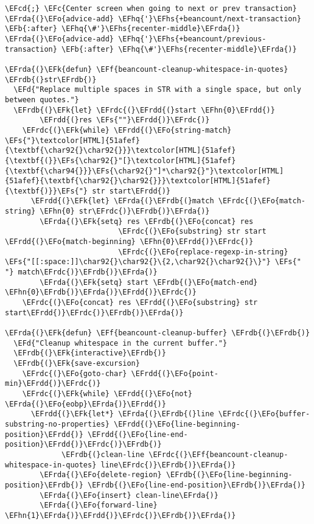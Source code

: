 \documentclass[a4wide,10pt]{article}
\newcommand{\EFc}[1]{\textcolor{EFc}{#1}} %
\newcommand{\EFcd}[1]{\textcolor{EFcd}{#1}} %
\newcommand{\EFs}[1]{\textcolor{EFs}{#1}} %
\newcommand{\EFd}[1]{\textcolor{EFd}{#1}} %
\newcommand{\EFk}[1]{\textcolor{EFk}{#1}} %
\newcommand{\EFb}[1]{\textcolor{EFb}{#1}} %
\newcommand{\EFf}[1]{\textcolor{EFf}{#1}} %
\newcommand{\EFo}[1]{\textcolor{EFo}{#1}} %
\newcommand{\EFhn}[1]{\textcolor{EFhn}{\textbf{#1}}} %
\newcommand{\EFhq}[1]{\textcolor{EFhq}{#1}} %
\newcommand{\EFhs}[1]{\textcolor{EFhs}{#1}} %
\newcommand{\EFrda}[1]{\textcolor{EFrda}{#1}} %
\newcommand{\EFrdb}[1]{\textcolor{EFrdb}{#1}} %
\newcommand{\EFrdc}[1]{\textcolor{EFrdc}{#1}} %
\newcommand{\EFrdd}[1]{\textcolor{EFrdd}{#1}} %
\begin{document}
\begin{Code}
\begin{Verbatim}
\EFcd{;} \EFc{Center screen when going to next or prev transaction}
\EFrda{(}\EFo{advice-add} \EFhq{'}\EFhs{+beancount/next-transaction} \EFb{:after} \EFhq{\#'}\EFhs{recenter-middle}\EFrda{)}
\EFrda{(}\EFo{advice-add} \EFhq{'}\EFhs{+beancount/previous-transaction} \EFb{:after} \EFhq{\#'}\EFhs{recenter-middle}\EFrda{)}

\EFrda{(}\EFk{defun} \EFf{beancount-cleanup-whitespace-in-quotes} \EFrdb{(}str\EFrdb{)}
  \EFd{"Replace multiple spaces in STR with a single space, but only between quotes."}
  \EFrdb{(}\EFk{let} \EFrdc{(}\EFrdd{(}start \EFhn{0}\EFrdd{)}
        \EFrdd{(}res \EFs{""}\EFrdd{)}\EFrdc{)}
    \EFrdc{(}\EFk{while} \EFrdd{(}\EFo{string-match} \EFs{"}\textcolor[HTML]{51afef}{\textbf{\char92{}\char92{}}}\textcolor[HTML]{51afef}{\textbf{(}}\EFs{\char92{}"[}\textcolor[HTML]{51afef}{\textbf{\char94{}}}\EFs{\char92{}"]*\char92{}"}\textcolor[HTML]{51afef}{\textbf{\char92{}\char92{}}}\textcolor[HTML]{51afef}{\textbf{)}}\EFs{"} str start\EFrdd{)}
      \EFrdd{(}\EFk{let} \EFrda{(}\EFrdb{(}match \EFrdc{(}\EFo{match-string} \EFhn{0} str\EFrdc{)}\EFrdb{)}\EFrda{)}
        \EFrda{(}\EFk{setq} res \EFrdb{(}\EFo{concat} res
                          \EFrdc{(}\EFo{substring} str start \EFrdd{(}\EFo{match-beginning} \EFhn{0}\EFrdd{)}\EFrdc{)}
                          \EFrdc{(}\EFo{replace-regexp-in-string} \EFs{"[[:space:]]\char92{}\char92{}\{2,\char92{}\char92{}\}"} \EFs{" "} match\EFrdc{)}\EFrdb{)}\EFrda{)}
        \EFrda{(}\EFk{setq} start \EFrdb{(}\EFo{match-end} \EFhn{0}\EFrdb{)}\EFrda{)}\EFrdd{)}\EFrdc{)}
    \EFrdc{(}\EFo{concat} res \EFrdd{(}\EFo{substring} str start\EFrdd{)}\EFrdc{)}\EFrdb{)}\EFrda{)}

\EFrda{(}\EFk{defun} \EFf{beancount-cleanup-buffer} \EFrdb{(}\EFrdb{)}
  \EFd{"Cleanup whitespace in the current buffer."}
  \EFrdb{(}\EFk{interactive}\EFrdb{)}
  \EFrdb{(}\EFk{save-excursion}
    \EFrdc{(}\EFo{goto-char} \EFrdd{(}\EFo{point-min}\EFrdd{)}\EFrdc{)}
    \EFrdc{(}\EFk{while} \EFrdd{(}\EFo{not} \EFrda{(}\EFo{eobp}\EFrda{)}\EFrdd{)}
      \EFrdd{(}\EFk{let*} \EFrda{(}\EFrdb{(}line \EFrdc{(}\EFo{buffer-substring-no-properties} \EFrdd{(}\EFo{line-beginning-position}\EFrdd{)} \EFrdd{(}\EFo{line-end-position}\EFrdd{)}\EFrdc{)}\EFrdb{)}
             \EFrdb{(}clean-line \EFrdc{(}\EFf{beancount-cleanup-whitespace-in-quotes} line\EFrdc{)}\EFrdb{)}\EFrda{)}
        \EFrda{(}\EFo{delete-region} \EFrdb{(}\EFo{line-beginning-position}\EFrdb{)} \EFrdb{(}\EFo{line-end-position}\EFrdb{)}\EFrda{)}
        \EFrda{(}\EFo{insert} clean-line\EFrda{)}
        \EFrda{(}\EFo{forward-line} \EFhn{1}\EFrda{)}\EFrdd{)}\EFrdc{)}\EFrdb{)}\EFrda{)}


\end{Verbatim}
\end{Code}
\end{document}
